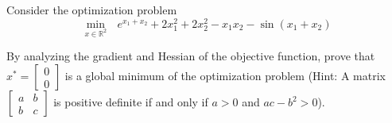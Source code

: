 \begin{homeworkProblem}
    
    Consider the optimization problem
    \begin{equation}
        \min_{x \in \mathbb R^2} \ \ \ e^{x_1+x_2} + 2x_1^2 + 2x_2^2 - x_1x_2
        - \sin(x_1+x_2)
    \end{equation}

    By analyzing the gradient and Hessian of the objective function, prove that 
    $x^* = \left[ \begin{array}{c} 0 \\ 0 \end{array} \right]$ is a global 
    minimum of the optimization problem (Hint: A matrix $\left[ \begin{array}{cc} 
    a & b \\ b & c \end{array} \right]$ is positive definite if and only if 
    $a > 0$ and $ac - b^2 > 0$). 

\end{homeworkProblem}